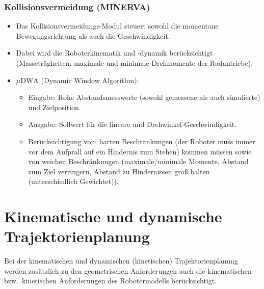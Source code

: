 \documentclass[a4paper, 11pt, accentcolor = tud3b]{tudreport}
\newcommand{\bzw}{bzw.~}
\begin{document}
				\subsubsection{Kollisionsvermeidung (MINERVA)}
					\begin{itemize}
						\item Das Kollisionsvermeidungs-Modul steuert sowohl die momentane Bewegungsrichtung als auch die Geschwindigkeit.
						\item Dabei wird die Roboterkinematik und -dynamik berücksichtigt (Masseträgheiten, maximale und minimale Drehmomente der Radantriebe).
						\item \(\mu\text{DWA}\) (Dynamic Window Algorithm):
							\begin{itemize}
								\item Eingabe: Rohe Abstandsmesswerte (sowohl gemessene als auch simulierte) und Zielposition.
								\item Ausgabe: Sollwert für die lineare und Drehwinkel-Geschwindigkeit.
								\item Berücksichtigung von: harten Beschränkungen (der Roboter muss immer vor dem Aufprall auf ein Hindernis zum Stehen) kommen müssen sowie von weichen Beschränkungen (maximale/minimale Momente, Abstand zum Ziel verringern, Abstand zu Hindernissen groß halten (unterschiedlich Gewichtet)).
							\end{itemize}
					\end{itemize}

		\section{Kinematische und dynamische Trajektorienplanung}
			Bei der kinematischen und dynamischen (kinetischen) Trajektorienplanung werden zusätzlich zu den geometrischen Anforderungen auch die kinematischen \bzw kinetischen Anforderungen des Robotermodells berücksichtigt.
\end{document}
